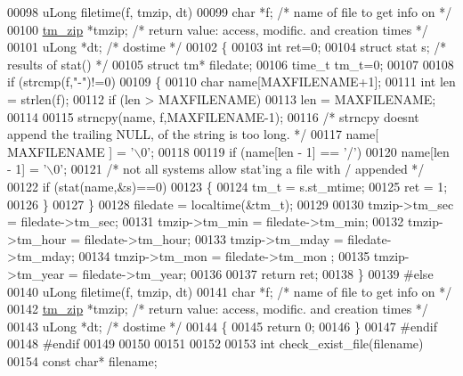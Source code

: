 \begin{DoxyCode}
00098 uLong filetime(f, tmzip, dt)
00099     \textcolor{keywordtype}{char} *f;               \textcolor{comment}{/* name of file to get info on */}
00100     \hyperlink{structtm__zip__s}{tm\_zip} *tmzip;         \textcolor{comment}{/* return value: access, modific. and creation times */}
00101     uLong *dt;             \textcolor{comment}{/* dostime */}
00102 \{
00103   \textcolor{keywordtype}{int} ret=0;
00104   \textcolor{keyword}{struct }stat s;        \textcolor{comment}{/* results of stat() */}
00105   \textcolor{keyword}{struct }tm* filedate;
00106   time\_t tm\_t=0;
00107 
00108   \textcolor{keywordflow}{if} (strcmp(f,\textcolor{stringliteral}{"-"})!=0)
00109   \{
00110     \textcolor{keywordtype}{char} name[MAXFILENAME+1];
00111     \textcolor{keywordtype}{int} len = strlen(f);
00112     \textcolor{keywordflow}{if} (len > MAXFILENAME)
00113       len = MAXFILENAME;
00114 
00115     strncpy(name, f,MAXFILENAME-1);
00116     \textcolor{comment}{/* strncpy doesnt append the trailing NULL, of the string is too long. */}
00117     name[ MAXFILENAME ] = \textcolor{charliteral}{'\(\backslash\)0'};
00118 
00119     \textcolor{keywordflow}{if} (name[len - 1] == \textcolor{charliteral}{'/'})
00120       name[len - 1] = \textcolor{charliteral}{'\(\backslash\)0'};
00121     \textcolor{comment}{/* not all systems allow stat'ing a file with / appended */}
00122     \textcolor{keywordflow}{if} (stat(name,&s)==0)
00123     \{
00124       tm\_t = s.st\_mtime;
00125       ret = 1;
00126     \}
00127   \}
00128   filedate = localtime(&tm\_t);
00129 
00130   tmzip->tm\_sec  = filedate->tm\_sec;
00131   tmzip->tm\_min  = filedate->tm\_min;
00132   tmzip->tm\_hour = filedate->tm\_hour;
00133   tmzip->tm\_mday = filedate->tm\_mday;
00134   tmzip->tm\_mon  = filedate->tm\_mon ;
00135   tmzip->tm\_year = filedate->tm\_year;
00136 
00137   \textcolor{keywordflow}{return} ret;
00138 \}
00139 \textcolor{preprocessor}{#else}
00140 uLong filetime(f, tmzip, dt)
00141     \textcolor{keywordtype}{char} *f;                \textcolor{comment}{/* name of file to get info on */}
00142     \hyperlink{structtm__zip__s}{tm\_zip} *tmzip;             \textcolor{comment}{/* return value: access, modific. and creation times */}
00143     uLong *dt;             \textcolor{comment}{/* dostime */}
00144 \{
00145     \textcolor{keywordflow}{return} 0;
00146 \}
00147 \textcolor{preprocessor}{#endif}
00148 \textcolor{preprocessor}{#endif}
00149 
00150 
00151 
00152 
00153 \textcolor{keywordtype}{int} check\_exist\_file(filename)
00154     \textcolor{keyword}{const} \textcolor{keywordtype}{char}* filename;

\end{DoxyCode}
